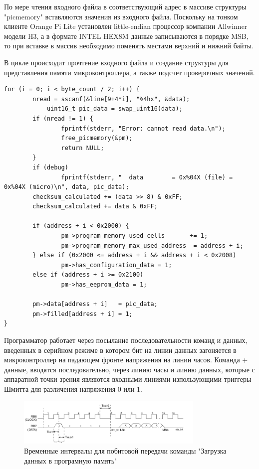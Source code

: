 По мере чтения входного файла в соответствующий адрес в массиве структуры "picmemory" вставляются значения из входного файла. 
Поскольку на тонком клиенте Orange Pi Lite установлен little-endian процессор 
компании Allwinner модели H3, а в формате INTEL HEX8M данные записываются в порядке 
MSB, то при вставке в массив необходимо поменять местами верхний и нижний байты.

В цикле происходит прочтение входного файла и создание структуры для представления памяти микроконтроллера, а также подсчет проверочных значений.
\begin{small}
\begin{verbatim}
for (i = 0; i < byte_count / 2; i++) {
        nread = sscanf(&line[9+4*i], "%4hx", &data);
	        uint16_t pic_data = swap_uint16(data);
        if (nread != 1) {
                fprintf(stderr, "Error: cannot read data.\n");
                free_picmemory(&pm);
                return NULL;
        }
        if (debug)
                fprintf(stderr, "  data        = 0x%04X (file) = 0x%04X (micro)\n", data, pic_data);
        checksum_calculated += (data >> 8) & 0xFF;
        checksum_calculated += data & 0xFF;

        if (address + i < 0x2000) {
                pm->program_memory_used_cells       += 1;
                pm->program_memory_max_used_address  = address + i;
        } else if (0x2000 <= address + i && address + i < 0x2008)
                pm->has_configuration_data = 1;
        else if (address + i >= 0x2100)
                pm->has_eeprom_data = 1;

        pm->data[address + i]   = pic_data;
        pm->filled[address + i] = 1;
}
\end{verbatim}
\end{small}

Программатор работает через посылание 
последовательности команд и данных, введенных в серийном режиме
в котором бит на линии данных загоняется в микроконтроллер на падающем
фронте напряжения на линии часов. Команда + данные, вводятся последовательно, 
через линию часы и линию данных, которые с аппаратной точки зрения являются входными линиями 
изпользующими триггеры Шмитта для различения напряжения 0 или 1. 

\begin{figure}[h!]
    \centering
    \includegraphics[width=0.8\textwidth]{2017-05-09_at_09:32:56_screenshot.png}
    \caption{Временные интервалы для побитовой передачи команды "Загрузка данных в програмную память"}
\end{figure}


